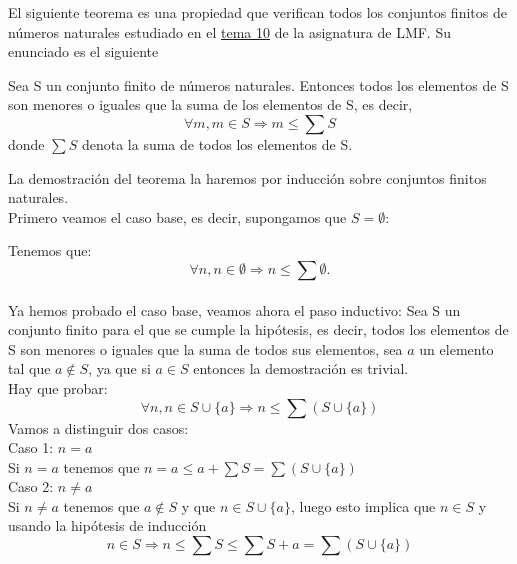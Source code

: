 %
\begin{isabellebody}%
%
%
\isadelimtheory
\isanewline
%
\endisadelimtheory
%
\isatagtheory
%
\endisatagtheory
{\isafoldtheory}%
%
\isadelimtheory
%
\endisadelimtheory
%
\begin{isamarkuptext}%
%
\end{isamarkuptext}\isamarkuptrue%
%
\begin{isamarkuptext}%
%
\end{isamarkuptext}\isamarkuptrue%
%
\begin{isamarkuptext}%
%
\end{isamarkuptext}\isamarkuptrue%
%
\begin{isamarkuptext}%
El siguiente teorema es una propiedad que verifican todos los conjuntos finitos de números
  naturales  estudiado en el \href{http://bit.ly/2XBW6n2}{tema 10} de la
asignatura de LMF. Su enunciado es el siguiente 

  \begin{teorema} 
    Sea S un conjunto finito de números naturales.  Entonces todos los
 elementos de S son menores o iguales que la suma de los elementos de
 S, es decir, $$\forall m , m \in S \Longrightarrow m \leq \sum S$$ 
\newline
donde $\sum S $ denota la suma de todos los elementos de S.
  \end{teorema} 

\begin{demostracion}
La demostración del teorema la haremos por inducción sobre conjuntos
 finitos naturales.\\
Primero veamos el caso base, es decir, supongamos que $S = \emptyset$:

Tenemos que: $$\forall n, n \in \emptyset \Longrightarrow n \leq \sum
 \emptyset.$$\\
Ya hemos probado el caso base, veamos ahora el paso inductivo:
\newline
Sea S un conjunto finito para el que se cumple la hipótesis, es decir,
 todos los elementos de S son menores o iguales que la suma de todos sus
elementos, sea $a$ un elemento tal que $a \notin S$, ya que si $a \in S$
entonces la demostración es trivial.\\
Hay que probar: $$\forall n , n \in S \cup \{ a \} \Longrightarrow n
 \leq \sum (S \cup \{ a \})$$
Vamos a distinguir dos casos:\\
Caso 1: $n = a$ \\
Si $n = a$ tenemos que $n = a \leq a + \sum S = \sum ( S \cup \{ a
 \})$\\
Caso 2: $n \neq a$\\
Si $n \neq a$ tenemos que $a \notin S$ y que $n \in S \cup \{ a \}$,
 luego esto implica que $n \in S$ y usando la hipótesis de inducción
$$n \in S \Longrightarrow n \leq \sum S \leq \sum S + a = \sum (S \cup
 \{ a \})$$
\end{demostracion}


\end{isamarkuptext}
\end{isabellebody}
